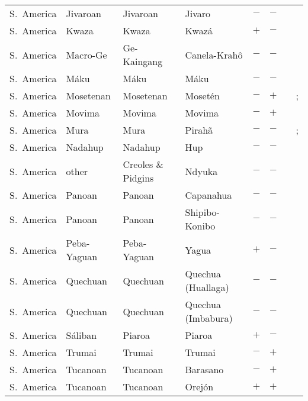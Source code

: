 \begin{landscape}
\begin{longtable}{l>{\raggedright\arraybackslash}p{2.2cm}>{\raggedright}p{2.5cm}>{\raggedright\arraybackslash}p{2.5cm}cc>{\raggedright\arraybackslash}p{3.4cm}>{\raggedright\arraybackslash}p{3.4cm}}
S.~America & Jivaroan & Jivaroan & Jivaro & $-$ & $-$ & \citealt{Gil2013} & \citealt[32]{Saad2014}\\
S.~America & Kwaza & Kwaza & Kwazá & $+$ & $-$ & \citealt{Gil2013} & \citealt[24, 105]{Voort2004}\\
S.~America & Macro-Ge & Ge-Kaingang & Canela-Krahô & $-$ & $-$ & \citealt{Gil2013} & \citealt{Corbett2013}\\
S.~America & Máku & Máku & Máku & $-$ & $-$ & \citealt{Gil2013} & \citealt[362]{Aikhenvald1999}\\
S.~America & Mosetenan & Mosetenan & Mosetén & $-$ & $+$ & \citealt{Gil2013} & \citealt{Corbett2013}; \citealt[288--302]{Sakel2002}\\
S.~America & Movima & Movima & Movima & $-$ & $+$ & \citealt[10, 113--114]{Haude2006} & \citealt[148--149]{Haude2006}\\
S.~America & Mura & Mura & Pirahã & $-$ & $-$ & \citealt{Gil2013} & \citealt{Corbett2013}; \citealt[281]{Everett1986}\\
S.~America & Nadahup & Nadahup & Hup & $-$ & $-$ & \citealt{Gil2013} & \citealt[191--195, 241--244]{Epps2008}\\
S.~America & other & Creoles \& Pidgins & Ndyuka & $-$ & $-$ & \citealt{Gil2013} & \citealt{Corbett2013}\\
S.~America & Panoan & Panoan & Capanahua & $-$ & $-$ & \citealt{Gil2013} & \citealt[passim]{Loos1969}\\
S.~America & Panoan & Panoan & Shipibo-Konibo & $-$ & $-$ & \citealt{Gil2013} & \citealt{Corbett2013}\\
S.~America & Peba-Yaguan & Peba-Yaguan & Yagua & $+$ & $-$ & \citealt{Gil2013} & \citealt[457, 460--462]{Payne2007}\\
S.~America & Quechuan & Quechuan & Quechua (Huallaga) & $-$ & $-$ & \citealt{Gil2013} & \citealt[passim]{Weber1989}\\
S.~America & Quechuan & Quechuan & Quechua (Imbabura) & $-$ & $-$ & \citealt{Gil2013} & \citealt{Corbett2013}\\
S.~America & Sáliban & Piaroa & Piaroa & $+$ & $-$ & \citealt{Gil2013} & \citealt[passim]{Krute1989}\\
S.~America & Trumai & Trumai & Trumai & $-$ & $+$ & \citealt[68--75]{Guirardello1999} & \citealt[48--55]{Guirardello1999}\\
S.~America & Tucanoan & Tucanoan & Barasano & $-$ & $+$ & \citealt[49--50, 59--60]{Jones1991} & \citealt[31, 73--75]{Jones1991}\\
S.~America & Tucanoan & Tucanoan & Orejón & $+$ & $+$ & \citealt{Gil2013} & \citealt[24--27]{Velie1975}\\

\end{longtable}
\end{landscape}
